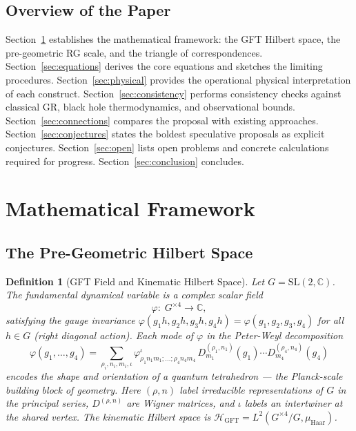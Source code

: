 \documentclass[12pt,a4paper]{article}
\newtheorem{definition}{Definition}
\newcommand{\GFT}{\mathrm{GFT}}
\begin{document}
\subsection{Overview of the Paper}

Section~\ref{sec:framework} establishes the mathematical framework:
the GFT Hilbert space, the pre-geometric RG scale, and the triangle of
correspondences.
Section~\ref{sec:equations} derives the core equations and sketches the
limiting procedures.
Section~\ref{sec:physical} provides the operational physical
interpretation of each construct.
Section~\ref{sec:consistency} performs consistency checks against
classical GR, black hole thermodynamics, and observational bounds.
Section~\ref{sec:connections} compares the proposal with existing
approaches.
Section~\ref{sec:conjectures} states the boldest speculative proposals
as explicit conjectures.
Section~\ref{sec:open} lists open problems and concrete calculations
required for progress.
Section~\ref{sec:conclusion} concludes.

\section{Mathematical Framework}
\label{sec:framework}

\subsection{The Pre-Geometric Hilbert Space}

\begin{definition}[GFT Field and Kinematic Hilbert Space]
\label{def:gft_field}
Let $G = \mathrm{SL}(2,\mathbb{C})$.
The fundamental dynamical variable is a complex scalar field
\begin{equation}
\label{eq:gft_field}
\varphi:\; G^{\times 4} \longrightarrow \mathbb{C},
\end{equation}
satisfying the gauge invariance $\varphi(g_1 h, g_2 h, g_3 h, g_4 h)
= \varphi(g_1,g_2,g_3,g_4)$ for all $h\in G$ (right diagonal action).
Each mode of $\varphi$ in the Peter-Weyl decomposition
\begin{equation}
\label{eq:peter_weyl}
\varphi(g_1,\ldots,g_4) = \sum_{\rho_i,n_i,m_i,\iota}
\varphi^{\iota}_{\rho_1 n_1 m_1;\ldots;\rho_4 n_4 m_4}\,
D^{(\rho_1,n_1)}_{m_1}(g_1)\cdots D^{(\rho_4,n_4)}_{m_4}(g_4)
\end{equation}
encodes the shape and orientation of a quantum tetrahedron — the
Planck-scale building block of geometry.
Here $(\rho,n)$ label irreducible representations of $G$ in the
principal series, $D^{(\rho,n)}$ are Wigner matrices, and $\iota$
labels an intertwiner at the shared vertex.
The kinematic Hilbert space is
$\mathcal{H}_\GFT = L^2(G^{\times 4}/G, \mu_\mathrm{Haar})$.
\end{definition}
\end{document}
